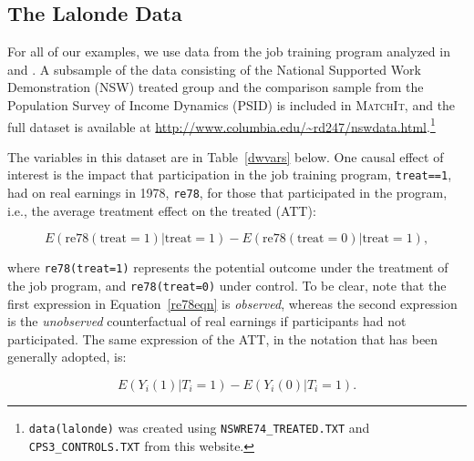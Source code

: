 \documentclass[oneside,letterpaper,titlepage]{article}
\newcommand{\MatchIt}{\textsc{MatchIt}}
\begin{document}
\subsection{The Lalonde Data}
For all of our examples, we use data from the job training program
analyzed in \citet{lalonde86} and \citet{DehWah99}.  A subsample of
the data consisting of the National Supported Work
Demonstration (NSW) treated group and the comparison sample from the Population
Survey of Income Dynamics (PSID) is included in \MatchIt, and the full
dataset is available at
\url{http://www.columbia.edu/~rd247/nswdata.html}.\footnote{\texttt{data(lalonde)}
  was created using \texttt{NSWRE74\_TREATED.TXT} and
  \texttt{CPS3\_CONTROLS.TXT} from this website.}

The variables in this dataset are in Table~\ref{dwvars} below.  One
causal effect of interest is the impact that participation in the job
training program, \texttt{treat==1}, had on real earnings in 1978,
\texttt{re78}, for those that participated in the program, i.e., the
average treatment effect on the treated (ATT):

\begin{equation}\label{re78eqn}
E(\text{re78}(\text{treat}=1) | \text{treat}=1) - E(\text{re78}(\text{treat}=0) | \text{treat}=1),
\end{equation}

\noindent where \texttt{re78(treat=1)} represents the potential
outcome under the treatment of the job program, and
\texttt{re78(treat=0)} under control.  To be clear, note that the
first expression in Equation~\ref{re78eqn} is \emph{observed}, whereas
the second expression is the \emph{unobserved} counterfactual of real
earnings if participants had not participated.  The same expression of
the ATT, in the notation that has been generally adopted, is:

\begin{equation}
E(Y_i(1) | T_i=1 ) - E(Y_i(0) | T_i=1).
\end{equation}
\end{document}
